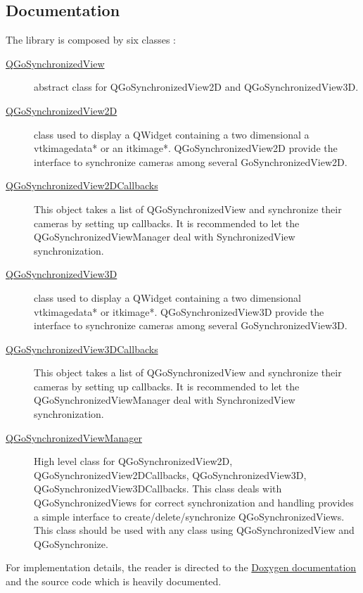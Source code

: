\documentclass{InsightArticle}
\begin{document}
\subsection*{Documentation}
The library is composed by six classes :
\begin{description}
  \item [\href {http://gofigure2.sourceforge.net/Doxygen/Nightly/html/classQGoSynchronizedView.html}{QGoSynchronizedView}]
    abstract class for QGoSynchronizedView2D and QGoSynchronizedView3D.
  \item [\href {http://gofigure2.sourceforge.net/Doxygen/Nightly/html/classQGoSynchronizedView2D.html}{QGoSynchronizedView2D}]
    class used to display a QWidget containing a two dimensional a vtkimagedata* or an itkimage*. QGoSynchronizedView2D provide the interface to synchronize cameras among several GoSynchronizedView2D.
  \item [\href {http://gofigure2.sourceforge.net/Doxygen/Nightly/html/classQGoSynchronizedView2DCallbacks.html}{QGoSynchronizedView2DCallbacks}]
    This object takes a list of QGoSynchronizedView and synchronize their cameras by setting up callbacks. It is recommended to let the QGoSynchronizedViewManager deal with SynchronizedView synchronization.
  \item [\href {http://gofigure2.sourceforge.net/Doxygen/Nightly/html/classQGoSynchronizedView3D.html}{QGoSynchronizedView3D}]class used to display a QWidget containing a two dimensional vtkimagedata* or itkimage*. QGoSynchronizedView3D provide the interface to synchronize cameras among several GoSynchronizedView3D.
  \item [\href {http://gofigure2.sourceforge.net/Doxygen/Nightly/html/classQGoSynchronizedView3DCallbacks.html}{QGoSynchronizedView3DCallbacks}]
  This object takes a list of QGoSynchronizedView and synchronize their cameras by setting up callbacks. It is recommended to let the QGoSynchronizedViewManager deal with SynchronizedView synchronization.
  \item [\href {http://gofigure2.sourceforge.net/Doxygen/Nightly/html/classQGoSynchronizedViewManager.html}{QGoSynchronizedViewManager}]
  High level class for QGoSynchronizedView2D, QGoSynchronizedView2DCallbacks, QGoSynchronizedView3D, QGoSynchronizedView3DCallbacks. This class deals with QGoSynchronizedViews for correct synchronization and handling provides a simple interface to create/delete/synchronize QGoSynchronizedViews. This class should be used with any class using QGoSynchronizedView and QGoSynchronize.
\end{description}
For implementation details, the reader is directed to the \href {http://gofigure2.sourceforge.net/Doxygen/Nightly/} {Doxygen documentation} and the source code which is heavily documented.
\end{document}
